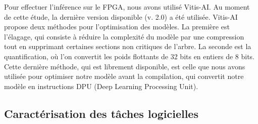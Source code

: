 Pour effectuer l'inférence sur le FPGA, nous avons utilisé Vitis-AI. Au moment de cette étude, la dernière version disponible (v. 2.0) a été utilisée. Vitis-AI propose deux méthodes pour l'optimisation des modèles. La première est l'élagage, qui consiste à réduire la complexité du modèle par une compression tout en supprimant certaines sections non critiques de l'arbre. La seconde est la quantification, où l'on convertit les poids flottants de 32 bits en entiers de 8 bits. Cette dernière méthode, qui est librement disponible, est celle que nous avons utilisée pour optimiser notre modèle avant la compilation, qui convertit notre modèle en instructions DPU (Deep Learning Processing Unit).

\subsection{Caractérisation des tâches logicielles}
\label{section:herofake-offline:workload}

\begin{table}[t]
\caption{Workload characterization }
\centering
{}%
\label{table:herofake-tasks}
\end{table}

